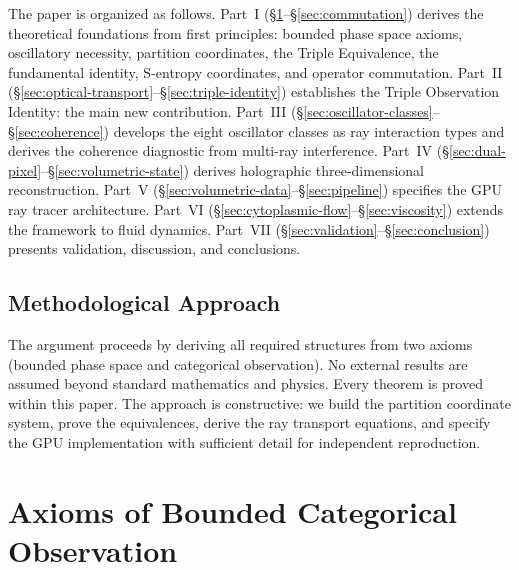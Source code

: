 \documentclass[11pt,twocolumn,a4paper]{article}
\begin{document}

The paper is organized as follows. Part~I
(\S\ref{sec:axioms}--\S\ref{sec:commutation}) derives the theoretical
foundations from first principles: bounded phase space axioms,
oscillatory necessity, partition coordinates, the Triple Equivalence,
the fundamental identity, S-entropy coordinates, and operator
commutation. Part~II
(\S\ref{sec:optical-transport}--\S\ref{sec:triple-identity}) establishes
the Triple Observation Identity: the main new contribution. Part~III
(\S\ref{sec:oscillator-classes}--\S\ref{sec:coherence}) develops the
eight oscillator classes as ray interaction types and derives the
coherence diagnostic from multi-ray interference. Part~IV
(\S\ref{sec:dual-pixel}--\S\ref{sec:volumetric-state}) derives
holographic three-dimensional reconstruction. Part~V
(\S\ref{sec:volumetric-data}--\S\ref{sec:pipeline}) specifies the GPU
ray tracer architecture. Part~VI
(\S\ref{sec:cytoplasmic-flow}--\S\ref{sec:viscosity}) extends the
framework to fluid dynamics. Part~VII
(\S\ref{sec:validation}--\S\ref{sec:conclusion}) presents validation,
discussion, and conclusions.

\subsection{Methodological Approach}

The argument proceeds by deriving all required structures from two
axioms (bounded phase space and categorical observation). No external
results are assumed beyond standard mathematics and physics. Every
theorem is proved within this paper. The approach is constructive:
we build the partition coordinate system, prove the equivalences,
derive the ray transport equations, and specify the GPU implementation
with sufficient detail for independent reproduction.


\section{Axioms of Bounded Categorical Observation}
\label{sec:axioms}
\end{document}
